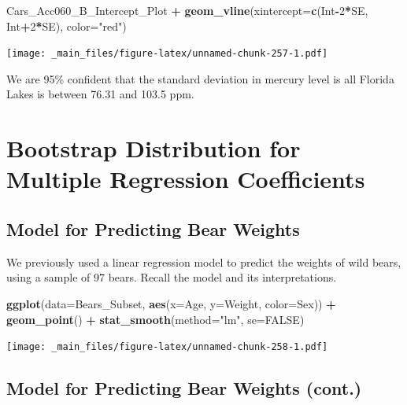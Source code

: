 \documentclass[]{book}
\newenvironment{Shaded}{\begin{snugshade}}{\end{snugshade}}
\newcommand{\KeywordTok}[1]{\textcolor[rgb]{0.13,0.29,0.53}{\textbf{#1}}}
\newcommand{\DataTypeTok}[1]{\textcolor[rgb]{0.13,0.29,0.53}{#1}}
\newcommand{\DecValTok}[1]{\textcolor[rgb]{0.00,0.00,0.81}{#1}}
\newcommand{\StringTok}[1]{\textcolor[rgb]{0.31,0.60,0.02}{#1}}
\newcommand{\OtherTok}[1]{\textcolor[rgb]{0.56,0.35,0.01}{#1}}
\newcommand{\OperatorTok}[1]{\textcolor[rgb]{0.81,0.36,0.00}{\textbf{#1}}}
\newcommand{\NormalTok}[1]{#1}
\begin{document}
\begin{Shaded}
\begin{Highlighting}[]
\NormalTok{Cars_Acc060_B_Intercept_Plot  }\OperatorTok{+}\StringTok{ }\KeywordTok{geom_vline}\NormalTok{(}\DataTypeTok{xintercept=}\KeywordTok{c}\NormalTok{(Int}\OperatorTok{-}\DecValTok{2}\OperatorTok{*}\NormalTok{SE, Int}\OperatorTok{+}\DecValTok{2}\OperatorTok{*}\NormalTok{SE), }\DataTypeTok{color=}\StringTok{"red"}\NormalTok{) }
\end{Highlighting}
\end{Shaded}

\texttt{[image: \_main\_files/figure-latex/unnamed-chunk-257-1.pdf]}

We are 95\% confident that the standard deviation in mercury level is
all Florida Lakes is between 76.31 and 103.5 ppm.

\section{Bootstrap Distribution for Multiple Regression
Coefficients}\label{bootstrap-distribution-for-multiple-regression-coefficients}

\subsection{Model for Predicting Bear
Weights}\label{model-for-predicting-bear-weights}

We previously used a linear regression model to predict the weights of
wild bears, using a sample of 97 bears. Recall the model and its
interpretations.

\begin{Shaded}
\begin{Highlighting}[]
\KeywordTok{ggplot}\NormalTok{(}\DataTypeTok{data=}\NormalTok{Bears_Subset, }\KeywordTok{aes}\NormalTok{(}\DataTypeTok{x=}\NormalTok{Age, }\DataTypeTok{y=}\NormalTok{Weight, }\DataTypeTok{color=}\NormalTok{Sex)) }\OperatorTok{+}\StringTok{ }
\StringTok{  }\KeywordTok{geom_point}\NormalTok{() }\OperatorTok{+}\StringTok{ }\KeywordTok{stat_smooth}\NormalTok{(}\DataTypeTok{method=}\StringTok{"lm"}\NormalTok{, }\DataTypeTok{se=}\OtherTok{FALSE}\NormalTok{)}
\end{Highlighting}
\end{Shaded}

\texttt{[image: \_main\_files/figure-latex/unnamed-chunk-258-1.pdf]}

\subsection{Model for Predicting Bear Weights
(cont.)}\label{model-for-predicting-bear-weights-cont.}
\end{document}
